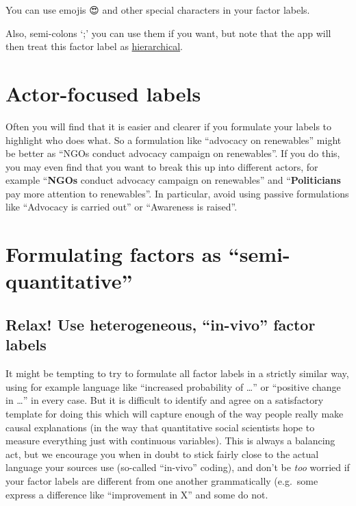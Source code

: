 \documentclass[
]{book}
\begin{document}
You can use emojis 😍 and other special characters in your factor labels.

Also, semi-colons `;' you can use them if you want, but note that the app will then treat this factor label as \protect\hyperlink{xhierarchical-coding}{hierarchical}.

\hypertarget{actor-focused-labels}{%
\section{Actor-focused labels}\label{actor-focused-labels}}

Often you will find that it is easier and clearer if you formulate your labels to highlight who does what. So a formulation like ``advocacy on renewables'' might be better as ``NGOs conduct advocacy campaign on renewables''. If you do this, you may even find that you want to break this up into different actors, for example ``\textbf{NGOs} conduct advocacy campaign on renewables'' and ``\textbf{Politicians} pay more attention to renewables''. In particular, avoid using passive formulations like ``Advocacy is carried out'' or ``Awareness is raised''.

\hypertarget{formulating-factors-as-semi-quantitative}{%
\section{Formulating factors as ``semi-quantitative''}\label{formulating-factors-as-semi-quantitative}}

\hypertarget{relax-use-heterogeneous-in-vivo-factor-labels}{%
\subsection{Relax! Use heterogeneous, ``in-vivo'' factor labels}\label{relax-use-heterogeneous-in-vivo-factor-labels}}

It might be tempting to try to formulate all factor labels in a strictly similar way, using for example language like ``increased probability of \ldots{}'' or ``positive change in \ldots{}'' in every case. But it is difficult to identify and agree on a satisfactory template for doing this which will capture enough of the way people really make causal explanations (in the way that quantitative social scientists hope to measure everything just with continuous variables). This is always a balancing act, but we encourage you when in doubt to stick fairly close to the actual language your sources use (so-called ``in-vivo'' coding), and don't be \emph{too} worried if your factor labels are different from one another grammatically (e.g.~some express a difference like ``improvement in X'' and some do not.
\end{document}
